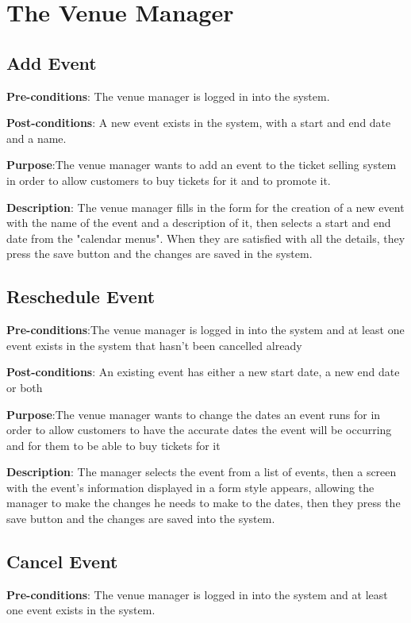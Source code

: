 \section{The Venue Manager}

\subsection{Add Event}
\textbf{Pre-conditions}: The venue manager is logged in into the system.

\textbf{Post-conditions}: A new event exists in the system, with a start
and end date and a name.

\textbf{Purpose}:The venue manager wants to add an event to the ticket
selling system in order to allow customers to buy tickets for it and
to promote it.

\textbf{Description}: The venue manager fills in the form for the creation
of a new event with the name of the event and a description of it, then
selects a start and end date from the "calendar menus". When they are
satisfied with all the details, they press the save button and the
changes are saved in the system.

\subsection{Reschedule Event}
\textbf{Pre-conditions}:The venue manager is logged in into the system
and at least one event exists in the system that hasn't been cancelled
already

\textbf{Post-conditions}: An existing event has either a new start date,
a new end date or both

\textbf{Purpose}:The venue manager wants to change the dates an event
runs for in order to allow customers to have the accurate dates the
event will be occurring and for them to be able to buy tickets for it

\textbf{Description}:
The manager selects the event from a list of events, then a screen with
the event's information displayed in a form style appears, allowing the
manager to  make the changes he needs to make to the dates, then they
press the save button and the changes are saved into the system.

\subsection{Cancel Event}
\textbf{Pre-conditions}: The venue manager is logged in into the system and
at least one event exists in the system.


